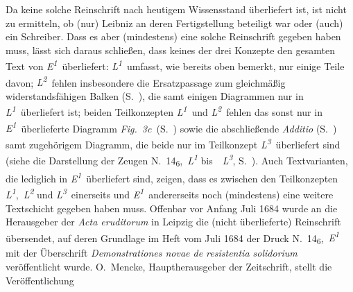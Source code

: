 Da keine solche Reinschrift nach heutigem Wissensstand überliefert ist, ist nicht zu ermitteln, ob (nur) Leibniz an deren Fertigstellung beteiligt war oder (auch) ein Schreiber.
Dass es aber (mindestens) eine solche Reinschrift gegeben haben muss, lässt sich daraus schließen, dass keines der drei Konzepte den gesamten Text von \textit{E\textsuperscript{1}}~überliefert:
\textit{L\textsuperscript{1}}~umfasst, wie bereits oben bemerkt, nur einige Teile davon;
\textit{L\textsuperscript{2}}~fehlen insbesondere die Ersatzpassage zum gleichmäßig widerstandsfähigen Balken %
(S.~), die samt einigen Diagrammen nur in \textit{L\textsuperscript{1}}~überliefert ist;
beiden Teilkonzepten \textit{L\textsuperscript{1}}~und \textit{L\textsuperscript{2}}~fehlen das sonst nur in \textit{E\textsuperscript{1}}~überlieferte Diagramm \lbrack\textit{Fig.~3c}\rbrack\ (S.~\pageref{AE_1684_321_Fig_3c}) sowie die abschließende \textit{Additio} (S.~) samt zugehörigem Diagramm, die beide nur im Teilkonzept \textit{L\textsuperscript{3}}~überliefert sind (siehe die Darstellung der Zeugen N.~14\textsubscript{6},~\textit{L\textsuperscript{1}} bis~~\textit{L\textsuperscript{3}}, S.~).
Auch Textvarianten, die lediglich in \textit{E\textsuperscript{1}}~überliefert sind, zeigen, dass es zwischen den Teilkonzepten \textit{L\textsuperscript{1}},~\textit{L\textsuperscript{2}} und \textit{L\textsuperscript{3}}~einerseits und \textit{E\textsuperscript{1}}~andererseits noch (mindestens) eine weitere Textschicht gegeben haben muss.
\pend%
\pstart%
Offenbar vor Anfang Juli 1684 wurde an die Herausgeber der \textit{Acta eruditorum}\cite{01023} in Leipzig die (nicht überlieferte) Reinschrift übersendet, auf deren Grundlage im Heft vom Juli 1684 der Druck N.~14\textsubscript{6},~\textit{E\textsuperscript{1}} mit der Überschrift \textit{Demonstrationes novae de resistentia solidorium} veröffentlicht wurde.
O.~Mencke,\protect{} Hauptherausgeber der Zeitschrift, stellt die Veröffentlichung %
